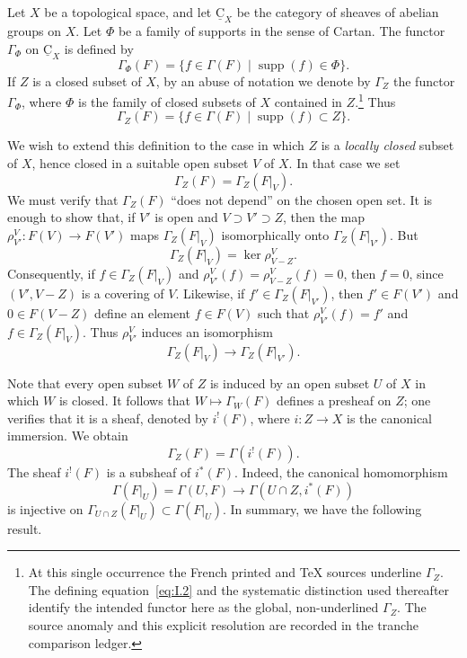 \documentclass[11pt,a4paper,oneside]{book}
\providecommand{\srcpage}[1]{%
  \marginpar{\raggedright\scriptsize\color{gray}Original French p.~#1}}
\providecommand{\uC}{\underline{\mathrm C}}
\providecommand{\restr}[2]{#1\vert_{#2}}
\theoremstyle{plain}
\theoremstyle{definition}
\theoremstyle{remark}
\begin{document}
\srcpage{6}
Let $X$ be a topological space, and let $\uC_X$ be the category of
sheaves of abelian groups on $X$.  Let $\Phi$ be a family of supports in
the sense of Cartan.  The functor $\Gamma_\Phi$ on $\uC_X$ is defined by
\begin{equation}
  \Gamma_\Phi(F)
  =\{f\in\Gamma(F)\mid \operatorname{supp}(f)\in\Phi\}.
  \tag{1}\label{eq:I.1}
\end{equation}
If $Z$ is a closed subset of $X$, by an abuse of notation we denote by
$\Gamma_Z$ the functor $\Gamma_\Phi$, where $\Phi$ is the family of
closed subsets of $X$ contained in $Z$.\footnote{At this single occurrence
the French printed and TeX sources underline $\Gamma_Z$.  The defining
equation~\eqref{eq:I.2} and the systematic distinction used thereafter
identify the intended functor here as the global, non-underlined $\Gamma_Z$.
The source anomaly and this explicit resolution are recorded in the tranche
comparison ledger.}
Thus
\begin{equation}
  \Gamma_Z(F)
  =\{f\in\Gamma(F)\mid \operatorname{supp}(f)\subset Z\}.
  \tag{2}\label{eq:I.2}
\end{equation}

We wish to extend this definition to the case in which $Z$ is a
\emph{locally closed} subset of $X$, hence closed in a suitable open subset
$V$ of $X$.  In that case we set
\begin{equation}
  \Gamma_Z(F)=\Gamma_Z(\restr{F}{V}).
  \tag{3}\label{eq:I.3}
\end{equation}
We must verify that $\Gamma_Z(F)$ ``does not depend'' on the chosen open
set.  It is enough to show that, if $V'$ is open and
$V\supset V'\supset Z$, then the map
$\rho^V_{V'}:F(V)\to F(V')$ maps
$\Gamma_Z(\restr{F}{V})$ isomorphically onto
$\Gamma_Z(\restr{F}{V'})$.  But
\begin{equation}
  \Gamma_Z(\restr{F}{V})=\ker\rho^V_{V-Z}.
  \tag{4}\label{eq:I.4}
\end{equation}
Consequently, if $f\in\Gamma_Z(\restr{F}{V})$ and
$\rho^V_{V'}(f)=\rho^V_{V-Z}(f)=0$, then $f=0$, since
$(V',V-Z)$ is a covering of $V$.  Likewise, if
$f'\in\Gamma_Z(\restr{F}{V'})$, then $f'\in F(V')$ and
\srcpage{7}$0\in F(V-Z)$ define an element $f\in F(V)$ such that
$\rho^V_{V'}(f)=f'$ and $f\in\Gamma_Z(\restr{F}{V})$.
Thus $\rho^V_{V'}$ induces an isomorphism
\[
  \Gamma_Z(\restr{F}{V})\longrightarrow
  \Gamma_Z(\restr{F}{V'}).
\]

Note that every open subset $W$ of $Z$ is induced by an open subset $U$
of $X$ in which $W$ is closed.  It follows that
$W\mapsto\Gamma_W(F)$ defines a presheaf on $Z$; one verifies that it is
a sheaf, denoted by $i^!(F)$, where $i:Z\to X$ is the canonical
immersion.  We obtain
\begin{equation}
  \Gamma_Z(F)=\Gamma(i^!(F)).
  \tag{5}\label{eq:I.5}
\end{equation}
The sheaf $i^!(F)$ is a subsheaf of $i^*(F)$.  Indeed, the canonical
homomorphism
\[
  \Gamma(\restr{F}{U})=\Gamma(U,F)\longrightarrow
  \Gamma(U\cap Z,i^*(F))
\]
is injective on
$\Gamma_{U\cap Z}(\restr{F}{U})\subset\Gamma(\restr{F}{U})$.
In summary, we have the following result.
\end{document}

